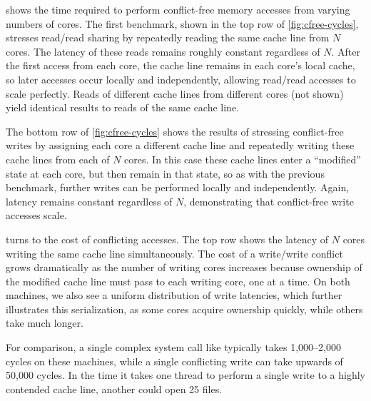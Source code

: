  shows the time required to perform
conflict-free memory accesses from varying numbers of cores.  The
first benchmark, shown in the top row of \cref{fig:cfree-cycles},
stresses read/read sharing by repeatedly reading the same cache line
from $N$ cores.  The latency of these reads remains roughly constant
regardless of $N$.
After the first access from each core, the cache
line remains in each core's local cache, so later accesses occur
locally and independently, allowing read/read accesses to scale
perfectly.  Reads of different cache lines from different cores (not
shown) yield identical results to reads of the same cache line.

The bottom row of \cref{fig:cfree-cycles} shows the results of
stressing conflict-free writes by assigning each core a different
cache line and repeatedly writing these cache lines from each of $N$
cores.  In this case these cache lines enter a ``modified'' state at
each core, but then remain in that state, so as with the previous
benchmark, further writes can be performed locally and independently.
%
Again, latency remains constant regardless of $N$, demonstrating that
conflict-free write accesses scale.

\begin{figure}
  \centering
  \label{fig:conflict-cycles}
\end{figure}

 turns to the cost of conflicting
accesses.  The top row shows the latency of $N$ cores writing the same
cache line simultaneously.  The cost of a write/write conflict grows
dramatically as the number of writing cores increases because
ownership of the modified cache line must pass to each writing
core, one at a time.  On both machines, we also see a uniform
distribution of write latencies, which further illustrates this
serialization, as some cores acquire ownership quickly, while others
take much longer.

For comparison, a single complex system call like 
typically takes 1,000--2,000 cycles on these machines, while a single
conflicting write can take upwards of 50,000 cycles.
%
In the time it takes one thread to perform a single write to a highly
contended cache line, another could open 25 files.


